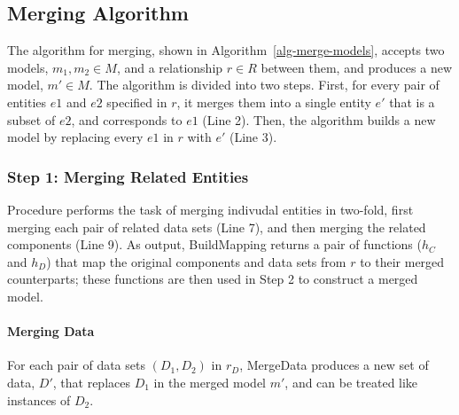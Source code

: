 \subsection{Merging Algorithm}

The algorithm for merging, shown in Algorithm~\ref{alg-merge-models},
accepts two models, $m_{1}, m_{2} \in M$, and a relationship $r \in R$
between them, and produces a new model, $m' \in M$. The algorithm is
divided into two steps. First, for every pair of entities $e1$ and
$e2$ specified in $r$, it merges them into a single entity $e'$ that is a
subset of $e2$, and corresponds to $e1$ (Line 2). Then, the algorithm
builds a new model by replacing every $e1$ in $r$ with $e'$ (Line 3).


\subsubsection{Step 1: Merging Related Entities}

Procedure  performs the task of merging indivudal
entities in two-fold, first merging each pair of related data sets
(Line 7), and then merging the related components (Line
9). As output, \textsf{BuildMapping} returns a pair of functions
($h_{C}$ and $h_{D}$) that map the original components and data sets
from $r$ to their merged counterparts; these functions are then used
in Step 2 to construct a merged model.


\paragraph{\textbf{Merging Data}} For each pair of data sets $(D_{1},
D_{2})$ in $r_{D}$, \textsf{MergeData} produces a new set of data, $D'$,
that replaces $D_{1}$ in the merged model $m'$, and can be treated
like instances of $D_{2}$. 

